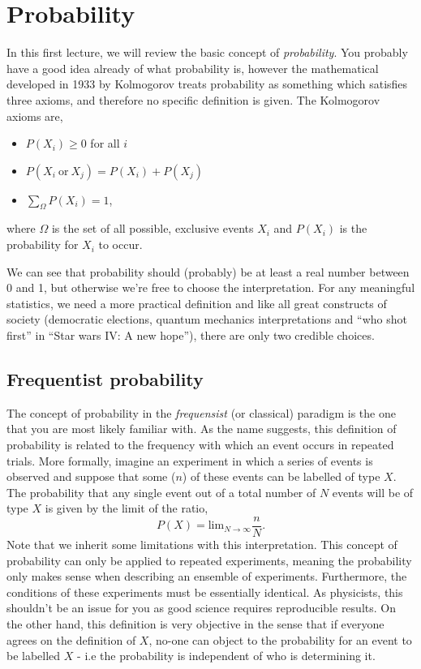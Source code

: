 \section{Probability}
In this first lecture, we will review the basic concept of \emph{probability}. You probably have a good idea already of what probability is, however the mathematical developed in 1933 by Kolmogorov treats probability as something which satisfies three axioms, and therefore no specific definition is given. The Kolmogorov axioms are, 
\begin{itemize}
    \item $P(X_i)\geq0$ for all $i$
    \item $P(X_i~\mathrm{or}~X_j)= P(X_i) + P(X_j)$ 
    \item $\sum_{\Omega}P(X_i) =1$,
\end{itemize}
where $\Omega$ is the set of all possible, exclusive events $X_i$ and $P(X_i)$ is the probability for $X_i$ to occur. 

We can see that probability should (probably) be at least a real number between 0 and 1, but otherwise we're free to choose the interpretation. For any meaningful statistics, we need a more practical definition and like all great constructs of society (democratic elections, quantum mechanics interpretations and ``who shot first'' in ``Star wars IV: A new hope''), there are only two credible choices. 

\subsection{Frequentist probability}

The concept of probability in the \emph{frequensist} (or classical) paradigm is the one that you are most likely familiar with. As the name suggests, this definition of probability is related to the frequency with which an event occurs in repeated trials. More formally, imagine an experiment in which a series of events is observed and suppose that some ($n$) of these events can be labelled of type $X $. The probability that any single event out of a total number of $N$ events will be of type $X$ is given by the limit of the ratio, 
\begin{equation}
    P(X) = \mathrm{lim}_{N\rightarrow \infty}\frac{n}{N}.
\end{equation}
Note that we inherit some limitations with this interpretation. This concept of probability can only be applied to repeated experiments, meaning the probability only makes sense when describing an ensemble of experiments. Furthermore, the conditions of these experiments must be essentially identical. As physicists, this shouldn't be an issue for you as good science requires reproducible results. On the other hand, this definition is very objective in the sense that if everyone agrees on the definition of $X$, no-one can object to the probability for an event to be labelled $X$ - i.e the probability is independent of who is determining it.  


